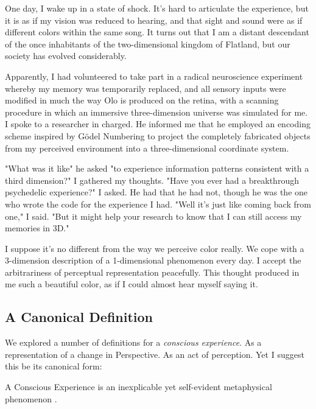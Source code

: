 \documentclass[runningheads]{llncs}
\begin{document}
\begin{aexample}
One day, I wake up in a state of shock. It's hard to articulate the experience, but it is as if my vision was reduced to hearing, and that sight and sound were as if different colors within the same song. It turns out that I am a distant descendant of the once inhabitants of the two-dimensional kingdom of Flatland, but our society has evolved considerably.

Apparently, I had volunteered to take part in a radical neuroscience experiment whereby my memory was temporarily replaced, and all sensory inputs were modified in much the way Olo is produced on the retina, with a scanning procedure in which an immersive three-dimension universe was simulated for me. I spoke to a researcher in charged. He informed me that he employed an encoding scheme inspired by Gödel Numbering to project the completely fabricated objects from my perceived environment into a three-dimensional coordinate system. 

"What was it like" he asked "to experience information patterns consistent with a third dimension?" I gathered my thoughts. "Have you ever had a breakthrough psychedelic experience?" I asked. He had that he had not, though he was the one who wrote the code for the experience I had. "Well it's just like coming back from one," I said. "But it might help your research to know that I can still access my memories in 3D." 

I suppose it's no different from the way we perceive color really. We cope with a 3-dimension description of a 1-dimensional phenomenon every day. I accept the arbitrariness of perceptual representation peacefully. This thought produced in me such a beautiful color, as if I could almost hear myself saying it.   
\end{aexample}


\subsection{A Canonical Definition}

We explored a number of definitions for a \emph{conscious experience}. As a representation of a change in Perspective. As an act of perception. Yet I suggest this be its canonical form:

\begin{definition}
	A Conscious Experience is an inexplicable yet self-evident metaphysical phenomenon \cite{Formalism}.
\end{definition}
\end{document}
